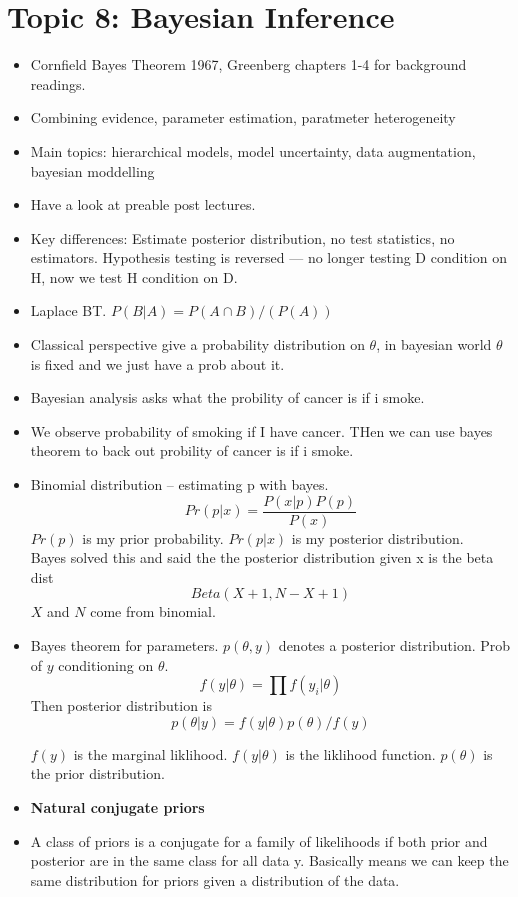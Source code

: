 \documentclass[12pt]{article}
\begin{document}
\section*{Topic 8: Bayesian Inference}
\begin{itemize}
      \item Cornfield Bayes Theorem 1967, Greenberg chapters 1-4 for background readings.
      \item Combining evidence, parameter estimation, paratmeter heterogeneity
      \item Main topics: hierarchical models, model uncertainty, data augmentation, bayesian moddelling
      \item Have a look at preable post lectures.
      \item Key differences: Estimate posterior distribution, no test statistics, no estimators. Hypothesis testing is reversed --- no longer testing D condition on H, now we test H condition on D.
      \item Laplace BT. $P(B|A) = P(A\cap B)/(P(A))$
      \item Classical perspective give a probability distribution on $\theta$, in bayesian world $\theta$ is fixed and we just have a prob about it.
      \item Bayesian analysis asks what the probility of cancer is if i smoke.
      \item We observe probability of smoking if I have cancer. THen we can use bayes theorem to back out probility of cancer is if i smoke.
      \item Binomial distribution -- estimating p with bayes.
            $$Pr(p|x) = \frac{P(x|p)P(p)}{P(x)}$$
            $Pr(p)$ is my prior probability. $Pr(p|x) $ is my posterior distribution. \\
            Bayes solved this and said the the posterior distribution given x is the beta dist
            $$Beta(X + 1, N - X + 1)$$
            $X$ and $N$ come from binomial.
      \item Bayes theorem for parameters.
            $p(\theta, y)$ denotes a posterior distribution.
            Prob of $y$ conditioning on $\theta$.
            $$ f(y|\theta) = \prod f(y_{i}|\theta)$$
            Then posterior distribution is
            $$ p(\theta|y) = f(y|\theta)p(\theta)/f(y)$$

            $f(y)$ is the marginal liklihood.
            $f(y|\theta)$ is the liklihood function.
            $p(\theta)$ is the prior distribution.

      \item \textbf{Natural conjugate priors}
      \item A class of priors is a conjugate for a family of likelihoods if both prior and posterior are in the same class for all data y.
            Basically means we can keep the same distribution for priors given a distribution of the data.


\end{itemize}
\end{document}
